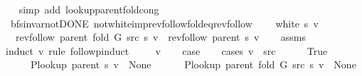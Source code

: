 \begin{isabellebody}
\ \ \isamarkupfalse%
\ {\isacharparenleft}{\kern0pt}simp\ add{\isacharcolon}{\kern0pt}\ lookup{\isacharunderscore}{\kern0pt}parent{\isacharunderscore}{\kern0pt}fold{\isacharunderscore}{\kern0pt}cong{\isacharparenright}{\kern0pt}%
\endisatagproof
{\isafoldproof}%
%
\isadelimproof
\isanewline
%
\endisadelimproof
\isanewline
{}\isamarkupfalse%
\ {\isacharparenleft}{\kern0pt}\ bfs{\isacharunderscore}{\kern0pt}invar{\isacharunderscore}{\kern0pt}not{\isacharunderscore}{\kern0pt}DONE{\isacharparenright}{\kern0pt}\ not{\isacharunderscore}{\kern0pt}white{\isacharunderscore}{\kern0pt}imp{\isacharunderscore}{\kern0pt}rev{\isacharunderscore}{\kern0pt}follow{\isacharunderscore}{\kern0pt}fold{\isacharunderscore}{\kern0pt}eq{\isacharunderscore}{\kern0pt}rev{\isacharunderscore}{\kern0pt}follow{\isacharcolon}{\kern0pt}\isanewline
\ \ \ {\isachardoublequoteopen}{\isasymnot}\ white\ s\ v{\isachardoublequoteclose}\isanewline
\ \ \ {\isachardoublequoteopen}rev{\isacharunderscore}{\kern0pt}follow\ {\isacharparenleft}{\kern0pt}parent\ {\isacharparenleft}{\kern0pt}fold\ G\ src\ s{\isacharparenright}{\kern0pt}{\isacharparenright}{\kern0pt}\ v\ {\isacharequal}{\kern0pt}\ rev{\isacharunderscore}{\kern0pt}follow\ {\isacharparenleft}{\kern0pt}parent\ s{\isacharparenright}{\kern0pt}\ v{\isachardoublequoteclose}\isanewline
%
\isadelimproof
\ \ %
\endisadelimproof
%
\isatagproof
{}\isamarkupfalse%
\ assms\isanewline
{}\isamarkupfalse%
\ {\isacharparenleft}{\kern0pt}induct\ v\ rule{\isacharcolon}{\kern0pt}\ follow{\isacharunderscore}{\kern0pt}pinduct{\isacharparenright}{\kern0pt}\isanewline
\ \ \isamarkupfalse%
\ {\isacharparenleft}{\kern0pt}{}\ v{\isacharparenright}{\kern0pt}\isanewline
\ \ \isamarkupfalse%
\ {\isacharquery}{\kern0pt}case\isanewline
\ \ \isamarkupfalse%
\ {\isacharparenleft}{\kern0pt}cases\ {\isachardoublequoteopen}v\ {\isacharequal}{\kern0pt}\ src{\isachardoublequoteclose}{\isacharparenright}{\kern0pt}\isanewline
\ \ \ \ \isamarkupfalse%
\ True\isanewline
\ \ \ \ \isamarkupfalse%
\isanewline
\ \ \ \ \ \ {\isachardoublequoteopen}P{\isacharunderscore}{\kern0pt}lookup\ {\isacharparenleft}{\kern0pt}parent\ s{\isacharparenright}{\kern0pt}\ v\ {\isacharequal}{\kern0pt}\ None{\isachardoublequoteclose}\isanewline
\ \ \ \ \ \ {\isachardoublequoteopen}P{\isacharunderscore}{\kern0pt}lookup\ {\isacharparenleft}{\kern0pt}parent\ {\isacharparenleft}{\kern0pt}fold\ G\ src\ s{\isacharparenright}{\kern0pt}{\isacharparenright}{\kern0pt}\ v\ {\isacharequal}{\kern0pt}\ None{\isachardoublequoteclose}\isanewline

\end{isabellebody}
